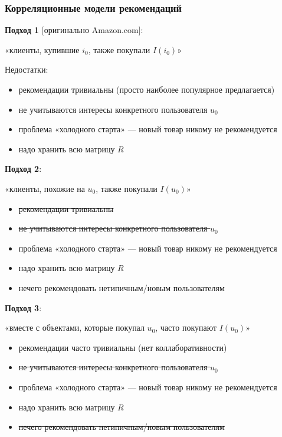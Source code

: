 \documentclass[fullscreen=true, bookmarks=true, hyperref={pdfencoding=unicode}]{beamer}
\begin{document}
\begin{frame}
  \frametitle{Корреляционные модели рекомендаций}

  {\bf Подход 1} [оригинально Amazon.com]:

  «клиенты, купившие $i_0$, также покупали $I(i_0)$»

  \vspace{1cm}
  Недостатки:
  \begin{itemize}
    \item рекомендации тривиальны (просто наиболее популярное предлагается)
    \item не учитываются интересы конкретного пользователя $u_0$
    \item проблема «холодного старта» — новый товар никому не рекомендуется
    \item надо хранить всю матрицу $R$
  \end{itemize}

\end{frame}


\begin{frame}

  {\bf Подход 2}:

  «клиенты, похожие на $u_0$, также покупали $I(u_0)$»

  \vspace{1cm}
  \begin{itemize}
   \item \sout{рекомендации тривиальны}
   \item \sout{не учитываются интересы конкретного пользователя $u_0$}
   \item проблема «холодного старта» — новый товар никому не рекомендуется
   \item надо хранить всю матрицу $R$
   \item {\color{gray} нечего рекомендовать нетипичным/новым пользователям}
  \end{itemize}

\end{frame}


\begin{frame}

  {\bf Подход 3}:

   «вместе с объектами, которые покупал $u_0$, часто покупают $I(u_0)$»

   \vspace{1cm}
   \begin{itemize}
    \item рекомендации часто тривиальны (нет коллаборативности)
    \item \sout{не учитываются интересы конкретного пользователя $u_0$}
    \item проблема «холодного старта» — новый товар никому не рекомендуется
    \item надо хранить всю матрицу $R$
    \item \sout{нечего рекомендовать нетипичным/новым пользователям}
   \end{itemize}
\end{frame}
\end{document}

